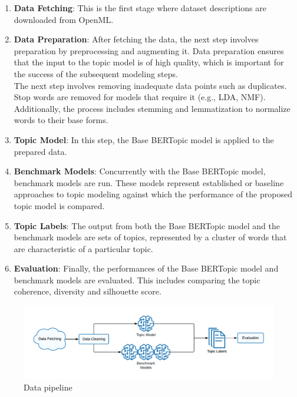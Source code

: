 \begin{enumerate}

    \item \textbf{Data Fetching}: This is the first stage where dataset descriptions are downloaded from OpenML.

    \item \textbf{Data Preparation}: After fetching the data, the next step involves preparation by preprocessing and augmenting it. Data preparation ensures that the input to the topic model is of high quality, which is important for the success of the subsequent modeling steps. \\ The next step involves removing inadequate data points such as duplicates. Stop words are removed for models that require it (e.g., LDA, NMF). Additionally, the process includes stemming and lemmatization to normalize words to their base forms.

    \item \textbf{Topic Model}: In this step, the Base BERTopic model is applied to the prepared data.

    \item \textbf{Benchmark Models}: Concurrently with the Base BERTopic model, benchmark models are run. These models represent established or baseline approaches \cite{grootendorst_bertopic_2022, blei_latent_2001, shahnaz_document_2006, kasiviswanathan_emerging_2011, yan_learning_2013, angelov_top2vec_2020, bianchi_pre-training_2021, bianchi_cross-lingual_2021} to topic modeling against which the performance of the proposed topic model is compared.

    \item \textbf{Topic Labels}: The output from both the Base BERTopic model and the benchmark models are sets of topics, represented by a cluster of words that are characteristic of a particular topic.

    \item \textbf{Evaluation}: Finally, the performances of the Base BERTopic model and benchmark models are evaluated. This includes comparing the topic coherence, diversity and silhouette score.

\end{enumerate}

\begin{figure}[h]
    \centering
    \includegraphics[width=\textwidth]{figures/data_pipeline.pdf}
    \caption{Data pipeline}
    \label{fig:data_pipeline}
\end{figure}

